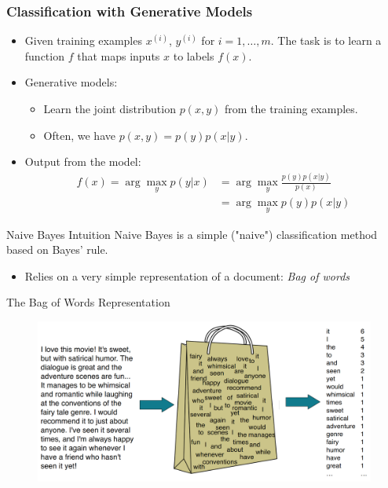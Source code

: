 \documentclass[handout]{beamer}
\begin{document}
\begin{frame}
  \frametitle{Classification with Generative Models}
  \begin{itemize}
    \item Given training examples $x^{(i)}$, $y^{(i)}$ for $i = 1, \ldots, m$. The task is to learn a function $f$ that maps inputs $x$ to labels $f(x)$.
    \item Generative models:
    \begin{itemize}
      \item Learn the joint distribution $p(x, y)$ from the training examples.
      \item Often, we have $p(x, y) = p(y)p(x|y)$.
    \end{itemize}
    \item Output from the model:
\[
\begin{aligned}
f(x) = \arg\max_y p(y|x) &= \arg\max_y \frac{p(y)p(x|y)}{p(x)} \\
&= \arg\max_y p(y)p(x|y)
\end{aligned}
\]
  \end{itemize}
\end{frame}




\begin{frame}{Naive Bayes Intuition}
    Naive Bayes is a simple ("naive") classification method based on Bayes' rule.
    \begin{itemize}
        \item Relies on a very simple representation of a document: \textit{Bag of words}
    \end{itemize}
\end{frame}

\begin{frame}{The Bag of Words Representation}

\begin{figure}[h]
\includegraphics[scale = 0.22]{pics/bow.png}
\end{figure}


\end{frame}
\end{document}
